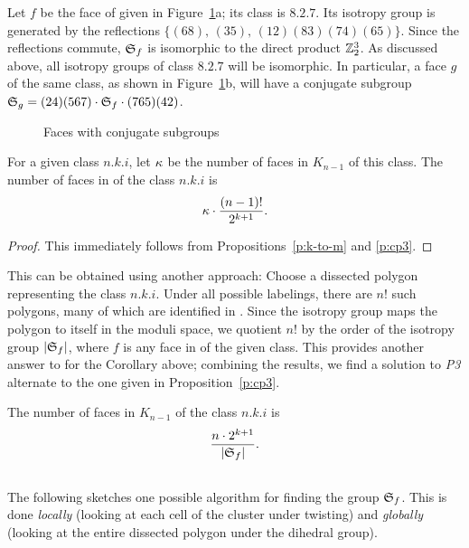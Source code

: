 \documentclass[10pt]{amsart}
\begin{document}
\begin{exmp}
Let $f$ be the face of  given in Figure~\ref{isotropy}a; its class is $8.2.7$.  Its isotropy group is generated by the reflections $\{(68),\, (35),\, (12)(83)(74)(65)\}$. Since the reflections commute,  ${\mathfrak S}_f$ is isomorphic to the direct product ${\mathbb Z}_2^3$. As discussed above, all isotropy groups of class $8.2.7$ will be isomorphic.  In particular, a face $g$ of the same class, as shown in Figure~\ref{isotropy}b, will have a conjugate subgroup  ${\mathfrak S}_g = (24)(567) \cdot {\mathfrak S}_f \cdot (765)(42)$.
\label{e:isotropy}
\end{exmp}

\begin{figure}[h]
\caption{Faces with conjugate subgroups}
\label{isotropy}
\end{figure}

\begin{cor}
For a given class $n.k.i$, let $\kappa$ be the number of faces in $K_{n-1}$ of this class.  The number of faces in  of the class $n.k.i$ is
$$\kappa \cdot \frac{(n-1)!}{2^{k+1}}.$$
\end{cor}

\begin{proof}
This immediately follows from Propositions~\ref{p:k-to-m} and \ref{p:cp3}.
\end{proof}

This can be obtained using another approach:  Choose a dissected polygon representing the class $n.k.i$.  Under all possible labelings, there are $n!$ such polygons, many of which are identified in .  Since the isotropy group maps the polygon to itself in the moduli space, we quotient $n!$ by the order of the isotropy group $|{\mathfrak S}_f|$, where $f$ is any face in  of the given class.  This provides another answer to for the Corollary above; combining the results, we find a solution to {\em P3}\, alternate to the one given in Proposition~\ref{p:cp3}.

\begin{prop}
The number of faces in $K_{n-1}$ of the class $n.k.i$ is 
$$\frac{n \cdot 2^{k+1}}{ |{\mathfrak S}_f|}.$$
\label{p:new}
\end{prop}


\subsection{}
The following sketches one possible algorithm for finding the group ${\mathfrak S}_f$.  This is done {\em locally} (looking at each cell of the cluster under twisting) and {\em globally} (looking at the entire dissected polygon under the dihedral group).
\end{document}
